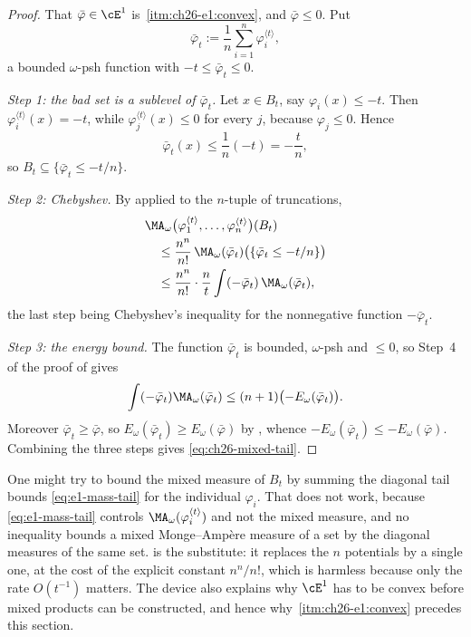 \begin{proof}
That \(\bar\varphi\in\cE^1\) is
\,\cref{itm:ch26-e1:convex}, and
\(\bar\varphi\leq0\).  Put
\[
 \bar\varphi_t:=\frac1n\sum_{i=1}^n\varphi_i^{\langle t\rangle},
\]
a bounded \(\omega\)-psh function with \(-t\leq\bar\varphi_t\leq0\).

\emph{Step 1: the bad set is a sublevel of \(\bar\varphi_t\).}  Let
\(x\in B_t\), say \(\varphi_i(x)\leq-t\).  Then
\(\varphi_i^{\langle t\rangle}(x)=-t\), while
\(\varphi_j^{\langle t\rangle}(x)\leq0\) for every \(j\), because
\(\varphi_j\leq0\).  Hence
\[
 \bar\varphi_t(x)\leq\frac1n(-t)=-\frac tn ,
\]
so \(B_t\subseteq\{\bar\varphi_t\leq-t/n\}\).

\emph{Step 2: Chebyshev.}  By  applied to
the \(n\)-tuple of truncations,
\[
 \begin{aligned}
 &\MA_\omega\bigl(\varphi_1^{\langle t\rangle},\ldots,
    \varphi_n^{\langle t\rangle}\bigr)(B_t)\\
 &\quad\leq\frac{n^n}{n!}\,
   \MA_\omega(\bar\varphi_t)
      \bigl(\{\bar\varphi_t\leq-t/n\}\bigr)\\
 &\quad\leq\frac{n^n}{n!}\cdot\frac{n}{t}
   \int(-\bar\varphi_t)\,\MA_\omega(\bar\varphi_t),
 \end{aligned}
\]
the last step being Chebyshev's inequality for the nonnegative function
\(-\bar\varphi_t\).

\emph{Step 3: the energy bound.}  The function \(\bar\varphi_t\) is bounded,
\(\omega\)-psh and \(\leq0\), so Step~4 of the proof of
 gives
\[
 \int(-\bar\varphi_t)\MA_\omega(\bar\varphi_t)
 \leq(n+1)\bigl(-E_\omega(\bar\varphi_t)\bigr).
\]
Moreover \(\bar\varphi_t\geq\bar\varphi\), so
\(E_\omega(\bar\varphi_t)\geq E_\omega(\bar\varphi)\) by
, whence
\(-E_\omega(\bar\varphi_t)\leq-E_\omega(\bar\varphi)\).  Combining the three
steps gives \eqref{eq:ch26-mixed-tail}.
\end{proof}

\begin{remark}
\label{rem:ch26-why-average}
One might try to bound the mixed measure of \(B_t\) by summing the diagonal
tail bounds \eqref{eq:e1-mass-tail} for the individual \(\varphi_i\).  That
does not work, because \eqref{eq:e1-mass-tail} controls
\(\MA_\omega(\varphi_i^{\langle t\rangle})\) and not the mixed measure, and
no inequality bounds a mixed Monge--Amp\`ere measure of a set by the
diagonal measures of the same set.   is the
substitute: it replaces the \(n\) potentials by a single one, at the cost of
the explicit constant \(n^n/n!\), which is harmless because only the rate
\(O(t^{-1})\) matters.  The device also explains why \(\cE^1\) has to be
convex before mixed products can be constructed, and hence why
\,\cref{itm:ch26-e1:convex} precedes this section.
\end{remark}

